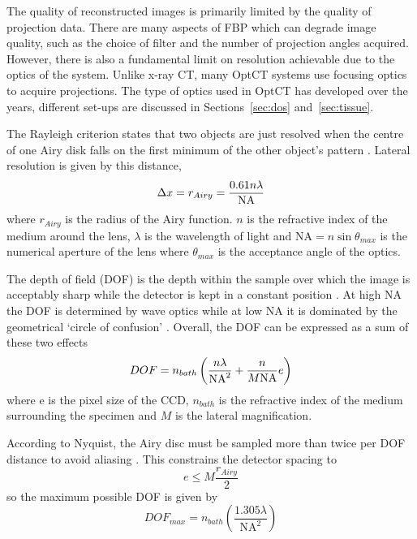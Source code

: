 \documentclass[12pt]{article}
\begin{document}
The quality of reconstructed images is primarily limited by the quality of projection data. There are many aspects of FBP which can degrade image quality, such as the choice of filter and the number of projection angles acquired. However, there is also a fundamental limit on resolution achievable due to the optics of the system. Unlike x-ray CT, many OptCT systems use focusing optics to acquire projections. The type of optics used in OptCT has developed over the years, different set-ups are discussed in Sections~\ref{sec:dos} and~\ref{sec:tissue}. 

The Rayleigh criterion states that two objects are just resolved when the centre of one Airy disk falls on the first minimum of the other object's pattern \cite{hecht2002optics}.
Lateral resolution is given by this distance,
\begin{equation}
\Delta x=r_{Airy} = \dfrac{0.61n\lambda}{\rm{NA}}
\label{eq:res}
\end{equation}
where $r_{Airy}$ is the radius of the Airy function. $n$ is the refractive index of the medium around the lens, $\lambda$ is the wavelength of light and NA$=n\sin \theta_{max}$ is the numerical aperture of the lens where $\theta_{max}$ is the acceptance angle of the optics.

The depth of field (DOF) is the depth within the sample over which the image is acceptably sharp while the detector is kept in a constant position . At high NA the DOF is determined by wave optics while at low NA it is dominated by the geometrical `circle of confusion' \cite{shinya1997video}. Overall, the DOF can be expressed as a sum of these two effects
\begin{equation}
DOF = n_{bath}\left(\dfrac{n\lambda}{\rm{NA}^{2}} + \dfrac{n}{M\rm{NA}}e\right)
\end{equation}
where e is the pixel size of the CCD, $n_{bath}$ is the refractive index of the medium surrounding the specimen and $M$ is the lateral magnification.

According to Nyquist, the Airy disc must be sampled more than twice per DOF distance to avoid aliasing \cite{Walls:2007jl}. This constrains the detector spacing to
\begin{equation}
e \leq M \dfrac{r_{Airy}}{2}
\end{equation}
so the maximum possible DOF is given by
\begin{equation}
DOF_{max} = n_{bath}\left(\dfrac{1.305\lambda}{\mathrm{NA}^{2}}\right)
\label{eq:DOFmax}
\end{equation}
\end{document}
